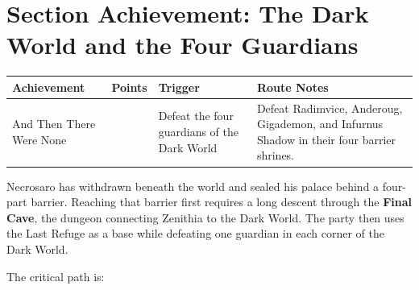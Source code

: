 \documentclass[
  american,
  10pt,
  letterpaper,
  oneside,
  open=any]{scrreprt}
\newcounter{none} %
\newenvironment{guidetable}{%
  \small\setstretch{1.0}%
  \setlength{\tabcolsep}{4pt}%
  \setlength{\LTpre}{8pt}\setlength{\LTpost}{10pt}%
  \renewcommand{\arraystretch}{1.16}%
}{ }
\begin{document}
\section{Section Achievement: The Dark World and the Four
Guardians}\label{section-achievement-the-dark-world-and-the-four-guardians}

\begin{guidetable}

{\def\LTcaptype{none} %
\begin{longtable}[]{@{}
  >{\raggedright\arraybackslash}p{}
  >{\raggedleft\arraybackslash}p{}
  >{\raggedright\arraybackslash}p{}
  >{\raggedright\arraybackslash}p{}@{}}
\toprule\noalign{}
\begin{minipage}[b]{\linewidth}\raggedright
\color{GuideGreen}\bfseries Achievement
\end{minipage} & \begin{minipage}[b]{\linewidth}\raggedleft
\color{GuideGreen}\bfseries Points
\end{minipage} & \begin{minipage}[b]{\linewidth}\raggedright
\color{GuideGreen}\bfseries Trigger
\end{minipage} & \begin{minipage}[b]{\linewidth}\raggedright
\color{GuideGreen}\bfseries Route Notes
\end{minipage} \\
\midrule\noalign{}
\endhead
\bottomrule\noalign{}
\endlastfoot
And Then There Were None & 10 & Defeat the four guardians of the Dark
World & Defeat Radimvice, Anderoug, Gigademon, and Infurnus Shadow in
their four barrier shrines. \\
\end{longtable}
}

\end{guidetable}

Necrosaro has withdrawn beneath the world and sealed his palace behind a
four-part barrier. Reaching that barrier first requires a long descent
through the \textbf{Final Cave}, the dungeon connecting Zenithia to the
Dark World. The party then uses the Last Refuge as a base while
defeating one guardian in each corner of the Dark World.

The critical path is:
\end{document}
